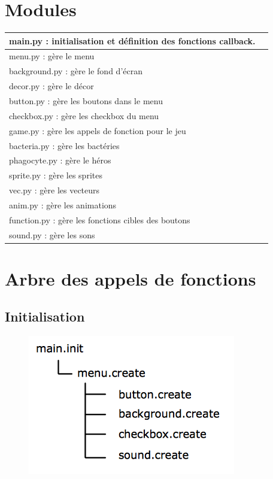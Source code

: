 \documentclass{article}
\begin{document}
\section{Modules}

\begin{tabular}{||l|l||}
 \hline main.py : initialisation et définition des fonctions callback. \\
 \hline menu.py : gère le menu \\
 \hline background.py : gère le fond d'écran \\
 \hline decor.py : gère le décor \\
 \hline button.py : gère les boutons dans le menu \\
 \hline checkbox.py : gère les checkbox du menu \\
 \hline game.py : gère les appels de fonction pour le jeu \\
 \hline bacteria.py : gère les bactéries \\
 \hline phagocyte.py : gère le héros \\
 \hline sprite.py : gère les sprites \\
 \hline vec.py : gère les vecteurs \\
 \hline anim.py : gère les animations \\
 \hline function.py : gère les fonctions cibles des boutons \\
 \hline sound.py : gère les sons \\
 \hline
\end{tabular}
\newpage

\section{Arbre des appels de fonctions}

\subsection{Initialisation}

\begin{center}
\begin{figure}[h]
\includegraphics[scale=0.5]{arbre_init.png}
\end{figure}
\end{center}
\end{document}
